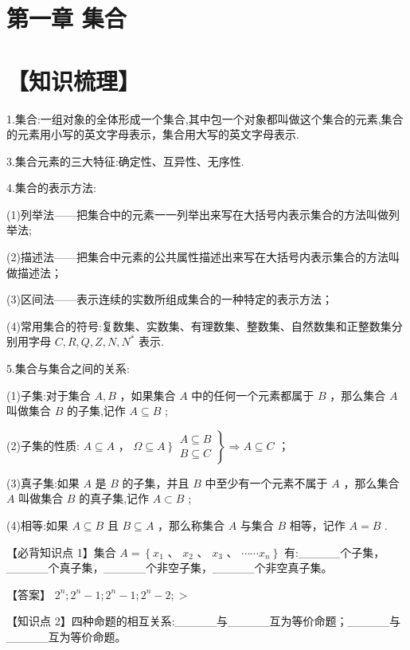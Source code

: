 \documentclass[10pt]{article}
\begin{document}
\section*{第一章 集合}

\section*{【知识梳理】}

1.集合:一组对象的全体形成一个集合,其中包一个对象都叫做这个集合的元素,集合的元素用小写的英文字母表示，集合用大写的英文字母表示.

3.集合元素的三大特征:确定性、互异性、无序性.

4.集合的表示方法:

(1)列举法——把集合中的元素一一列举出来写在大括号内表示集合的方法叫做列举法;

(2)描述法——把集合中元素的公共属性描述出来写在大括号内表示集合的方法叫做描述法；

(3)区间法——表示连续的实数所组成集合的一种特定的表示方法；

(4)常用集合的符号:复数集、实数集、有理数集、整数集、自然数集和正整数集分别用字母 \(C,R,Q,Z,N,{N}^{ * }\) 表示.

5.集合与集合之间的关系:

(1)子集:对于集合 \(A,B\) ，如果集合 \(A\) 中的任何一个元素都属于 \(B\) ，那么集合 \(A\) 叫做集合 \(B\) 的子集,记作 \(A \subseteq  B\) ;

(2)子集的性质: \(A \subseteq  A\) ， \(\left. {\left. {\Omega  \subseteq  A}\right\}  \begin{array}{l} A \subseteq  B \\  B \subseteq  C \end{array}}\right\}   \Rightarrow  A \subseteq  C\) ；

(3)真子集:如果 \(A\) 是 \(B\) 的子集，并且 \(B\) 中至少有一个元素不属于 \(A\) ，那么集合 \(A\) 叫做集合 \(B\) 的真子集,记作 \(A \subset  B\) ;

(4)相等:如果 \(A \subseteq  B\) 且 \(B \subseteq  A\) ，那么称集合 \(A\) 与集合 \(B\) 相等，记作 \(A = B\) .

【必背知识点 1】集合 \(A = \left\{  {{x}_{1}\text{ 、 }{x}_{2}\text{ 、 }{x}_{3}\text{ 、 }\cdots \cdots {x}_{n}}\right\}\) 有:\_\_\_\_\_个子集，\_\_\_\_\_个真子集，\_\_\_\_\_个非空子集，\_\_\_\_\_个非空真子集。

【答案】 \({2}^{n};{2}^{n} - 1;{2}^{n} - 1;{2}^{n} - 2; >\)

【知识点 2】四种命题的相互关系:\_\_\_\_\_与\_\_\_\_\_互为等价命题；\_\_\_\_\_与\_\_\_\_\_互为等价命题。
\end{document}
